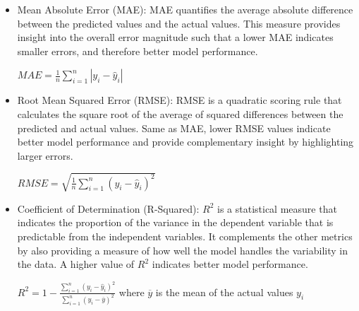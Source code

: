         \begin{itemize}
            \item Mean Absolute Error (MAE): MAE quantifies the average absolute difference between the predicted values and the actual values. This measure provides insight into the overall error magnitude such that a lower MAE indicates smaller errors, and therefore better model performance.\\
            \begin{center}
            $MAE = \frac{1}{n}\displaystyle\sum_{i=1}^{n}|y_i - \hat{y}_i|$
            \end{center}
            
            \item Root Mean Squared Error (RMSE): RMSE is a quadratic scoring rule that calculates the square root of the average of squared differences between the predicted and actual values. Same as MAE, lower RMSE values indicate better model performance and provide complementary insight by highlighting larger errors.\\
            \begin{center}
            $RMSE=\sqrt{\frac{1}{n} \displaystyle\sum_{i=1}^{n}(y_i-\hat{y}_i)^2}$
            \end{center}
    
            \item Coefficient of Determination (R-Squared): $R^2$ is a statistical measure that indicates the proportion of the variance in the dependent variable that is predictable from the independent variables. It complements the other metrics by also providing a measure of how well the model handles the variability in the data. A higher value of $R^2$ indicates better model performance.\\
            \begin{center}
            $R^2 = 1-\frac{\sum_{i=1}^{n}(y_i-\hat{y}_i)^2}{\sum_{i=1}^{n}(y_i-\overline{y})^2}$ 
            where $\overline{y}$ is the mean of the actual values $y_i$
            \end{center}
        \end{itemize}
        
